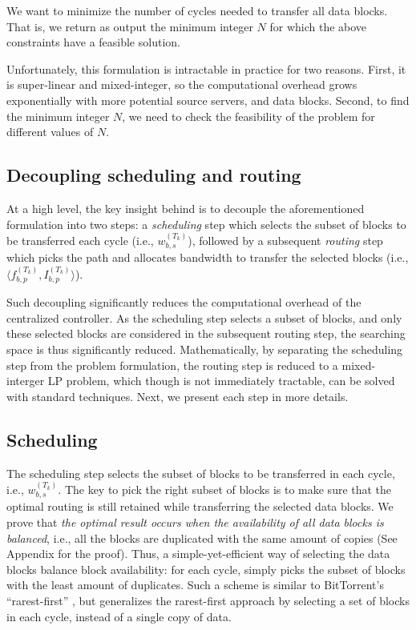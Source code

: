  We want to minimize the number of cycles needed to
transfer all data blocks. That is, we return as output the minimum
integer $N$ for which the above constraints have a feasible solution.

Unfortunately, this formulation is intractable in practice for two
reasons. First, it is super-linear and mixed-integer, so the
computational overhead grows exponentially with more potential source
servers, and data blocks. Second, to find the minimum integer $N$, we
need to check the feasibility of the problem for different values of
$N$.

\subsection{Decoupling scheduling and routing}
\label{subsec:logic:separation}

At a high level, the key insight behind \name is to decouple the
aforementioned formulation into two steps: a {\em scheduling} step
which selects the subset of blocks to be transferred each cycle
(i.e., $w^{(T_k)}_{b,s}$), followed by a subsequent {\em routing}
step which picks the path and allocates bandwidth to transfer the
selected blocks (i.e.,
$\langle f_{b,p}^{(T_k)}, I_{b,p}^{(T_k)}\rangle$).

Such decoupling significantly reduces the computational overhead of
the centralized controller. As the scheduling step selects a subset
of blocks, and only these selected blocks are considered in the
subsequent routing step, the searching space is thus significantly
reduced. Mathematically, by separating the scheduling step from the
problem formulation, the routing step is reduced to a mixed-interger
LP problem, which though is not immediately tractable, can be solved
with standard techniques. Next, we present each step in more details.

\subsection{Scheduling}
\label{subsec:logic:scheduling}

The scheduling step selects the subset of blocks to be transferred in
each cycle, i.e., $w^{(T_k)}_{b,s}$.
The key to pick the right subset of blocks is to make sure that the
optimal routing is still retained while transferring the selected data
blocks. We prove that {\em the optimal result occurs when the
availability of all data blocks is balanced}, i.e., all the blocks are
duplicated with the same amount of copies (See Appendix for the proof). Thus, a
simple-yet-efficient way of selecting the data blocks balance block
availability: for each cycle, \name simply picks the subset of blocks
with the least amount of duplicates. Such a scheme is similar to
BitTorrent's ``rarest-first'' \cite{Cohen2003Incentives}, but \name
generalizes the rarest-first approach by selecting a set of blocks in
each cycle, instead of a single copy of data.


